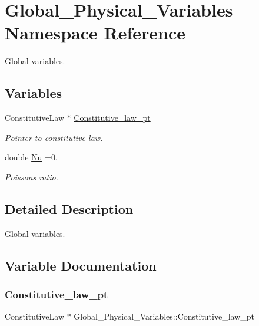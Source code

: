 \hypertarget{namespaceGlobal__Physical__Variables}{}\section{Global\+\_\+\+Physical\+\_\+\+Variables Namespace Reference}
\label{namespaceGlobal__Physical__Variables}


Global variables.  


\subsection*{Variables}
\begin{DoxyCompactItemize}
\item 
Constitutive\+Law $\ast$ \hyperlink{namespaceGlobal__Physical__Variables_a5d5f19442938130d36ee7476ae25049c}{Constitutive\+\_\+law\+\_\+pt}
\begin{DoxyCompactList}\small\item\em Pointer to constitutive law. \end{DoxyCompactList}\item 
double \hyperlink{namespaceGlobal__Physical__Variables_a3962c36313826b19f216f6bbbdd6a477}{Nu} =0.
\begin{DoxyCompactList}\small\item\em Poisson\textquotesingle{}s ratio. \end{DoxyCompactList}\end{DoxyCompactItemize}


\subsection{Detailed Description}
Global variables. 

\subsection{Variable Documentation}
\mbox{\label{namespaceGlobal__Physical__Variables_a5d5f19442938130d36ee7476ae25049c}} 
\subsubsection{\texorpdfstring{Constitutive\+\_\+law\+\_\+pt}{Constitutive\_law\_pt}}
{\footnotesize\ttfamily Constitutive\+Law $\ast$ Global\+\_\+\+Physical\+\_\+\+Variables\+::\+Constitutive\+\_\+law\+\_\+pt}



